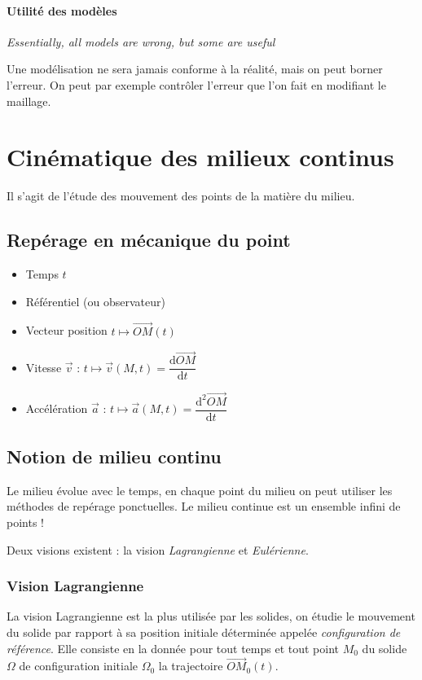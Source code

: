 \documentclass{article}
\newcommand{\deriv}{\mathrm{d}}
\begin{document}
\paragraph{Utilité des modèles} \emph{Essentially, all models are wrong, but some are useful}

Une modélisation ne sera jamais conforme à la réalité, mais on peut borner l'erreur. On peut par exemple contrôler l'erreur que l'on fait en modifiant le maillage.


\section{Cinématique des milieux continus}
Il s'agit de l'étude des mouvement des points de la matière du milieu.

\subsection{Repérage en mécanique du point}
\begin{itemize}[label=\textbullet]
\item Temps $t$
\item Référentiel (ou observateur)
\item Vecteur position $t \mapsto \overrightarrow{OM}(t)$
\item Vitesse $\vec{v}$ : $t \mapsto \vec{v}(M,t) = \dfrac{\deriv \overrightarrow{OM}}{\deriv t}$
\item Accélération $\vec{a}$ : $t \mapsto \vec{a}(M,t) = \dfrac{\deriv^2 \overrightarrow{OM}}{\deriv t}$
\end{itemize}

\subsection{Notion de milieu continu}
Le milieu évolue avec le temps, en chaque point du milieu on peut utiliser les méthodes de repérage ponctuelles. Le milieu continue est un ensemble infini de points !

Deux visions existent : la vision \emph{Lagrangienne} et \emph{Eulérienne}.

\subsubsection{Vision Lagrangienne}
La vision Lagrangienne est la plus utilisée par les solides, on étudie le mouvement du solide par rapport à sa position initiale déterminée appelée \emph{configuration de référence}. Elle consiste en la donnée pour tout temps et tout point $M_0$ du solide $\Omega$ de configuration initiale $\Omega_0$ la trajectoire $\overrightarrow{OM}_0(t)$.
\end{document}
